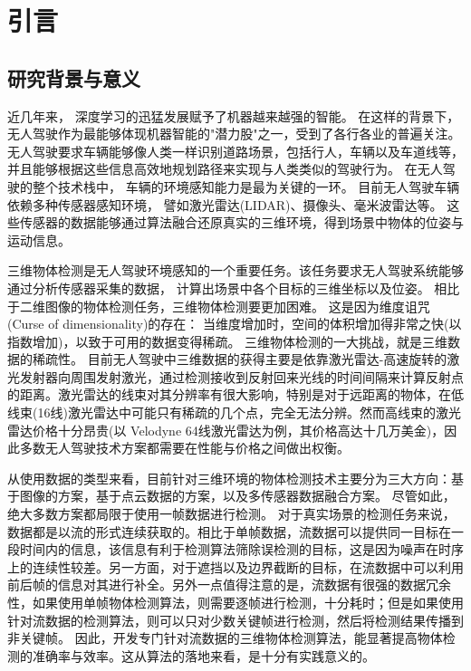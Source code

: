 \chapter{引言}
\label{ch:intro}
\section{研究背景与意义}
\label{sec:background}
近几年来， 深度学习的迅猛发展赋予了机器越来越强的智能。 在这样的背景下， 无人驾驶作为最能够体现机器智能的"潜力股"之一，受到了各行各业的普遍关注。 无人驾驶要求车辆能够像人类一样识别道路场景，包括行人，车辆以及车道线等，并且能够根据这些信息高效地规划路径来实现与人类类似的驾驶行为。 在无人驾驶的整个技术栈中， 车辆的环境感知能力是最为关键的一环。 目前无人驾驶车辆依赖多种传感器感知环境， 譬如激光雷达(LIDAR)、摄像头、毫米波雷达等。 这些传感器的数据能够通过算法融合还原真实的三维环境，得到场景中物体的位姿与运动信息。

三维物体检测是无人驾驶环境感知的一个重要任务。该任务要求无人驾驶系统能够通过分析传感器采集的数据， 计算出场景中各个目标的三维坐标以及位姿。 相比于二维图像的物体检测任务，三维物体检测要更加困难。 这是因为维度诅咒(Curse of dimensionality)的存在： 当维度增加时，空间的体积增加得非常之快(以指数增加)，以致于可用的数据变得稀疏。 三维物体检测的一大挑战，就是三维数据的稀疏性。 目前无人驾驶中三维数据的获得主要是依靠激光雷达-高速旋转的激光发射器向周围发射激光，通过检测接收到反射回来光线的时间间隔来计算反射点的距离。激光雷达的线束对其分辨率有很大影响，特别是对于远距离的物体，在低线束(16线)激光雷达中可能只有稀疏的几个点，完全无法分辨。然而高线束的激光雷达价格十分昂贵(以 Velodyne 64线激光雷达为例，其价格高达十几万美金)，因此多数无人驾驶技术方案都需要在性能与价格之间做出权衡。

从使用数据的类型来看，目前针对三维环境的物体检测技术主要分为三大方向：基于图像的方案，基于点云数据的方案，以及多传感器数据融合方案。 尽管如此，绝大多数方案都局限于使用一帧数据进行检测。 对于真实场景的检测任务来说，数据都是以流的形式连续获取的。相比于单帧数据，流数据可以提供同一目标在一段时间内的信息，该信息有利于检测算法筛除误检测的目标，这是因为噪声在时序上的连续性较差。另一方面，对于遮挡以及边界截断的目标，在流数据中可以利用前后帧的信息对其进行补全。另外一点值得注意的是，流数据有很强的数据冗余性，如果使用单帧物体检测算法，则需要逐帧进行检测，十分耗时；但是如果使用针对流数据的检测算法，则可以只对少数关键帧进行检测，然后将检测结果传播到非关键帧。 因此，开发专门针对流数据的三维物体检测算法，能显著提高物体检测的准确率与效率。这从算法的落地来看，是十分有实践意义的。 

